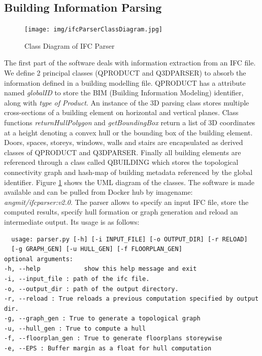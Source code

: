 \subsection{Building Information Parsing}



\begin{figure}
    \centering
    \texttt{[image: img/ifcParserClassDiagram.jpg]}
    \caption{Class Diagram of IFC Parser}
    \label{fig:ifcParserClassDiagram}
\end{figure}
 
 The first part of the software deals with information extraction from an IFC file. We define 2 principal classes (QPRODUCT and Q3DPARSER) to absorb the information defined in a building modelling file. QPRODUCT has a attribute named \textit{globalID} to store the BIM (Building Information Modeling) identifier, along with \textit{type of Product}. An instance of the 3D parsing class stores multiple cross-sections of a building element on horizontal and vertical planes. Class functions \textit{returnHullPolygon} and \textit{getBoundingBox} return a list of 3D coordinates at a height denoting a convex hull or the bounding box of the building element. Doors, spaces, storeys, windows, walls and stairs are encapsulated as derived classes of QPRODUCT and Q3DPARSER. Finally all building elements are referenced through a class called QBUILDING which stores the topological connectivity graph and hash-map of building metadata referenced by the global identifier. Figure \ref{fig:ifcParserClassDiagram} shows the UML diagram of the classes. The software is made available and can be pulled from Docker hub by imagename: \textit{angmit/ifcparser:v2.0}. The parser allows  to specify an input IFC file, store the computed results, specify hull formation or graph generation and reload an intermediate output. Its usage is as follows:

\newpage
\begin{lstlisting}
  usage: parser.py [-h] [-i INPUT_FILE] [-o OUTPUT_DIR] [-r RELOAD] 
  [-g GRAPH_GEN] [-u HULL_GEN] [-f FLOORPLAN_GEN]
optional arguments:
-h, --help            show this help message and exit
-i, --input_file : path of the ifc file.
-o, --output_dir : path of the output directory.
-r, --reload : True reloads a previous computation specified by output dir.
-g, --graph_gen : True to generate a topological graph
-u, --hull_gen : True to compute a hull
-f, --floorplan_gen : True to generate floorplans storeywise
-e, --EPS : Buffer margin as a float for hull computation
\end{lstlisting}


